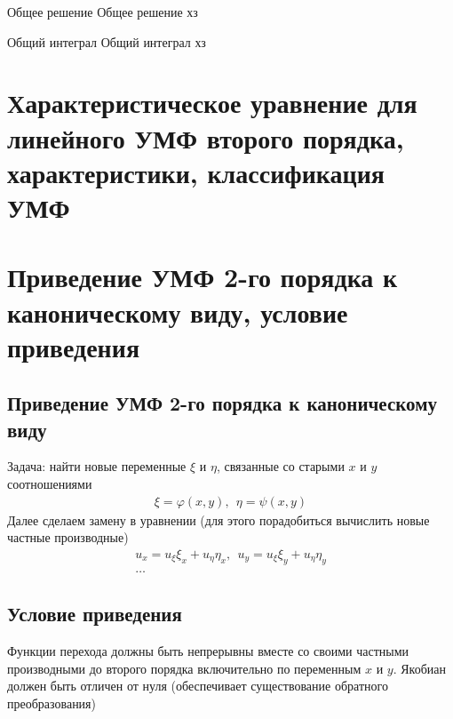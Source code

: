 \documentclass{article}[12pt]
\begin{document}
\begin{definition}
    {Общее решение}
    {Общее решение}
    хз
\end{definition}

\begin{definition}
    {Общий интеграл}
    {Общий интеграл}
    хз
\end{definition}

\section{Характеристическое уравнение для линейного УМФ второго
    порядка, характеристики, классификация УМФ}

\section{Приведение УМФ 2-го порядка к каноническому виду, условие
приведения}
\subsection{Приведение УМФ 2-го порядка к каноническому виду}
Задача: найти новые переменные $\xi$ и $\eta$, связанные со старыми $x$
и $y$ соотношениями
\begin{eqnarray*}
    \xi=\varphi(x,y),\ \ \eta=\psi(x,y)
\end{eqnarray*}
Далее сделаем замену в уравнении (для этого порадобиться вычислить новые
частные производные)
\begin{eqnarray*}
    u_{x}=u_{\xi}\xi_{x}+u_{\eta}\eta_{x}
    ,\ \ u_{y}=u_{\xi}\xi_{y}+u_{\eta}\eta_{y}\\
    \ldots
\end{eqnarray*}


\subsection{Условие приведения}
Функции перехода должны быть непрерывны вместе со своими частными
производными до второго порядка включительно по переменным $x$ и $y$. Якобиан
должен быть отличен от нуля (обеспечивает существование обратного преобразования)
\end{document}

